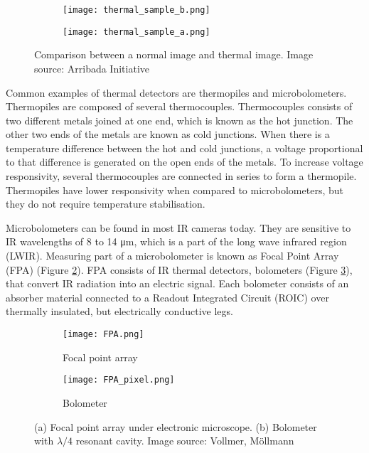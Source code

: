 \begin{figure}[ht]
    \begin{subfigure}{0.5\textwidth}
        \centering
        \texttt{[image: thermal\_sample\_b.png]} 
    \end{subfigure}
    \begin{subfigure}{0.5\textwidth}
        \centering
        \texttt{[image: thermal\_sample\_a.png]}
    \end{subfigure}
    \caption[Comparison between a normal image and thermal image]{Comparison between a normal image and thermal image. Image source: Arribada Initiative\cite{thermal_comparison}}
    \label{thermal_comparison}
\end{figure}

Common examples of thermal detectors are thermopiles and microbolometers. 
Thermopiles are composed of several thermocouples.
Thermocouples consists of two different metals joined at one end, which is known as the hot junction.
The other two ends of the metals are known as cold junctions.
When there is a temperature difference between the hot and cold junctions, a voltage proportional to that difference is generated on the open ends of the metals.
To increase voltage responsivity, several thermocouples are connected in series to form a thermopile\cite{thermal_book}.
Thermopiles have lower responsivity when compared to microbolometers, but they do not require temperature stabilisation\cite{thermal_book}.

Microbolometers can be found in most IR cameras today\cite{thermal_book}. 
They are sensitive to IR wavelengths of 8 to 14 \si{\micro\meter}, which is a part of the long wave infrared region (LWIR)\cite{thermal_book}.
Measuring part of a microbolometer is known as Focal Point Array (FPA) (Figure \ref{FPA}).
FPA consists of IR thermal detectors, bolometers (Figure \ref{FPA_pixel}), that convert IR radiation into an electric signal.
Each bolometer consists of an absorber material connected to a Readout Integrated Circuit (ROIC) over thermally insulated, but electrically conductive legs\cite{thermal_article}.
\newline

\begin{figure}[h]
    \begin{subfigure}{0.5\textwidth}
        \centering
        \texttt{[image: FPA.png]} 
        \caption{Focal point array}
        \label{FPA}
    \end{subfigure}
    \begin{subfigure}{0.5\textwidth}
        \centering
        \texttt{[image: FPA\_pixel.png]}
        \caption{Bolometer}
        \label{FPA_pixel}
    \end{subfigure}
    \caption[Focal point array and bolometer.] {(a) Focal point array under electronic microscope. (b) Bolometer with $\lambda /4$ resonant cavity. Image source: Vollmer, Möllmann\cite{thermal_book}}
    \label{FPA_microbolo}
\end{figure}

